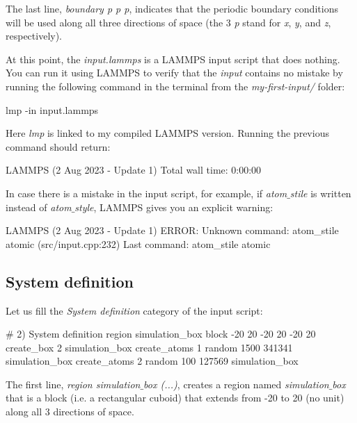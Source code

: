 \noindent The last line, \textit{boundary p p p}, indicates that the
periodic boundary conditions will be used along all three
directions of space (the 3 \textit{p} stand for \textit{x}, \textit{y}, and \textit{z},
respectively).

\vspace{0.25cm} \noindent At this point, the \textit{input.lammps} is a 
LAMMPS input script that does nothing.
You can run it using LAMMPS to verify that the \textit{input} contains
no mistake by running the following command in the terminal
from the \textit{my-first-input/}  folder:

\begin{lcverbatim}
lmp -in input.lammps
\end{lcverbatim}

\noindent Here \textit{lmp} is linked to my compiled LAMMPS version.
Running the previous command should return:

\begin{lcverbatim}
LAMMPS (2 Aug 2023 - Update 1)
Total wall time: 0:00:00
\end{lcverbatim}

\noindent In case there is a mistake in the input script, for example, if
\textit{atom$\_$stile} is written instead of \textit{atom$\_$style}, LAMMPS
gives you an explicit warning:

\begin{lcverbatim}
LAMMPS (2 Aug 2023 - Update 1)
ERROR: Unknown command: atom_stile  atomic (src/input.cpp:232)
Last command: atom_stile atomic
\end{lcverbatim}

\subsection{System definition}
Let us fill the \textit{System definition} category of the input script:

\begin{lcverbatim}
# 2) System definition
region simulation_box block -20 20 -20 20 -20 20
create_box 2 simulation_box
create_atoms 1 random 1500 341341 simulation_box
create_atoms 2 random 100 127569 simulation_box
\end{lcverbatim}

\noindent The first line, \textit{region simulation$\_$box (...)}, creates a region
named \textit{simulation$\_$box} that is a block (i.e. a rectangular cuboid) that
extends from -20 to 20 (no unit) along all 3 directions of space.

